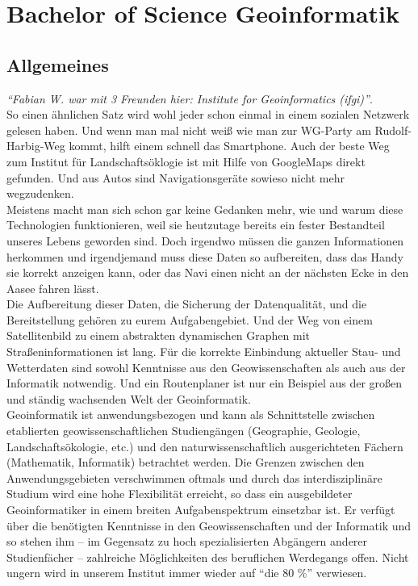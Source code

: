 \chapter{Bachelor of Science Geoinformatik}

\section{Allgemeines}

\emph{"`Fabian W. war mit 3 Freunden hier: Institute for Geoinformatics (ifgi)"'}.\\
So einen ähnlichen Satz wird wohl jeder schon einmal in einem sozialen Netzwerk gelesen haben. Und wenn man mal nicht weiß wie man zur WG-Party am Rudolf-Harbig-Weg kommt, hilft einem schnell das Smartphone. Auch der beste Weg zum Institut für Landschaftsöklogie ist mit Hilfe von GoogleMaps direkt gefunden. Und aus Autos sind Navigationsgeräte sowieso nicht mehr wegzudenken.\\
Meistens macht man sich schon gar keine Gedanken mehr, wie und warum diese Technologien funktionieren, weil sie heutzutage bereits ein fester Bestandteil unseres Lebens geworden sind. Doch irgendwo müssen die ganzen Informationen herkommen und irgendjemand muss diese Daten so aufbereiten, dass das Handy sie korrekt anzeigen kann, oder das Navi einen nicht an der nächsten Ecke in den Aasee fahren lässt.\\
Die Aufbereitung dieser Daten, die Sicherung der Datenqualität, und die Bereitstellung gehören zu eurem Aufgabengebiet. Und der Weg von einem Satellitenbild zu einem abstrakten dynamischen Graphen mit Straßeninformationen ist lang. Für die korrekte Einbindung aktueller Stau- und Wetterdaten sind sowohl Kenntnisse aus den Geowissenschaften als auch aus der Informatik notwendig. Und ein Routenplaner ist nur ein Beispiel aus der großen und ständig wachsenden Welt der Geoinformatik.\\
Geoinformatik ist anwendungsbezogen und kann als Schnittstelle zwischen etablierten geowissenschaftlichen Studiengängen (Geographie, Geologie, Landschaftsökologie, etc.) und den naturwissenschaftlich ausgerichteten Fächern (Mathematik, Informatik) betrachtet werden. Die Grenzen zwischen den Anwendungsgebieten verschwimmen oftmals und durch das interdisziplinäre Studium wird eine hohe Flexibilität erreicht, so dass ein ausgebildeter Geoinformatiker in einem breiten Aufgabenspektrum einsetzbar ist. Er verfügt über die benötigten Kenntnisse in den Geowissenschaften und der Informatik und so stehen ihm -- im Gegensatz zu hoch spezialisierten Abgängern anderer Studienfächer -- zahlreiche Möglichkeiten des beruflichen Werdegangs offen. Nicht ungern wird in unserem Institut immer wieder auf "`die 80 \%"' verwiesen.\\
